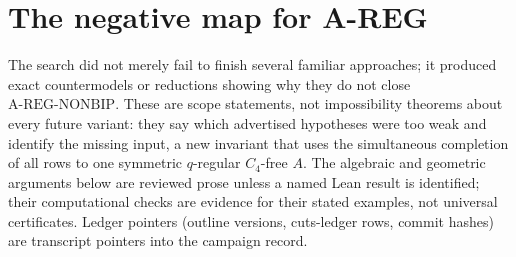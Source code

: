 \documentclass{anvil-paper}
\newcommand{\NONBIP}{\mathrm{A\text{-}REG\text{-}NONBIP}}
\theoremstyle{definition}
\begin{document}
\appendix

\section{The negative map for A-REG}\label{app:negative}

The search did not merely fail to finish several familiar approaches; it produced exact countermodels or reductions showing why they do not close $\NONBIP$. These are scope statements, not impossibility theorems about every future variant: they say which advertised hypotheses were too weak and identify the missing input, a new invariant that uses the simultaneous completion of all rows to one symmetric $q$-regular $C_4$-free $A$. The algebraic and geometric arguments below are reviewed prose unless a named Lean result is identified; their computational checks are evidence for their stated examples, not universal certificates. Ledger pointers (outline versions, cuts-ledger rows, commit hashes) are transcript pointers into the campaign record.
\end{document}
